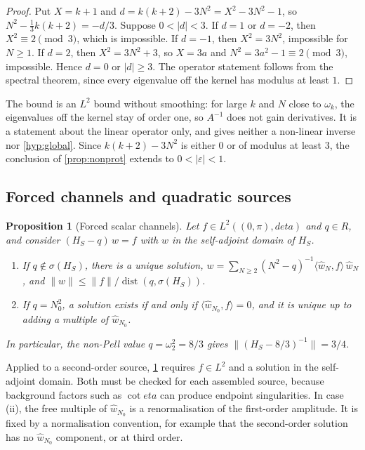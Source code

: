 \documentclass[11pt]{article}
\theoremstyle{canonmath}
\theoremstyle{canonpostulate}
\theoremstyle{canonproposition}
\theoremstyle{canonmath}
\newtheorem{proposition*}[theorem]{Proposition}
\theoremstyle{canonproposition}
\providecommand{\R}{\mathbb{R}}
\def\mathbb#1{#1}%
\def\mathcal#1{#1}%
\def\eta{eta}%
\begin{document}
\begin{proof}
Put $X = k+1$ and $d = k(k+2) - 3N^2 = X^2 - 3N^2 - 1$, so $N^2 - \tfrac13k(k+2) = -d/3$. Suppose $0<|d|<3$. If $d = 1$ or $d = -2$, then $X^2\equiv2\pmod3$, which is impossible. If $d = -1$, then $X^2 = 3N^2$, impossible for $N\ge1$. If $d = 2$, then $X^2 = 3N^2+3$, so $X = 3a$ and $N^2 = 3a^2-1\equiv2\pmod3$, impossible. Hence $d = 0$ or $|d|\ge3$. The operator statement follows from the spectral theorem, since every eigenvalue off the kernel has modulus at least $1$.
\end{proof}

The bound is an $L^2$ bound without smoothing: for large $k$ and $N$ close to $\omega_k$, the eigenvalues off the kernel stay of order one, so $\mathcal A^{-1}$ does not gain derivatives. It is a statement about the linear operator only, and gives neither a non-linear inverse nor \ref{hyp:global}. Since $k(k+2)-3N^2$ is either $0$ or of modulus at least $3$, the conclusion of \cref{prop:nonprot} extends to $0<|\varepsilon|<1$.

\subsection{Forced channels and quadratic sources}

\begin{proposition*}[Forced scalar channels]\label{prop:fredholm}
Let $f\in L^2((0,\pi),d\eta)$ and $q\in\R$, and consider $(\mathcal{H}_S - q)\,w = f$ with $w$ in the self-adjoint domain of $\mathcal{H}_S$.
\begin{enumerate}[label=(\roman*)]
\item If $q\notin\sigma(\mathcal{H}_S)$, there is a unique solution, $w = \sum_{N\ge2}(N^2-q)^{-1}\langle\hat w_N,f\rangle\,\hat w_N$, and $\|w\|\le\|f\|/\operatorname{dist}(q,\sigma(\mathcal{H}_S))$.
\item If $q = N_0^2$, a solution exists if and only if $\langle\hat w_{N_0},f\rangle = 0$, and it is unique up to adding a multiple of $\hat w_{N_0}$.
\end{enumerate}
In particular, the non-Pell value $q = \omega_2^2 = 8/3$ gives $\|(\mathcal{H}_S-8/3)^{-1}\| = 3/4$.
\end{proposition*}

Applied to a second-order source, \cref{prop:fredholm} requires $f\in L^2$ and a solution in the self-adjoint domain. Both must be checked for each assembled source, because background factors such as $\cot\eta$ can produce endpoint singularities. In case (ii), the free multiple of $\hat w_{N_0}$ is a renormalisation of the first-order amplitude. It is fixed by a normalisation convention, for example that the second-order solution has no $\hat w_{N_0}$ component, or at third order.
\end{document}
